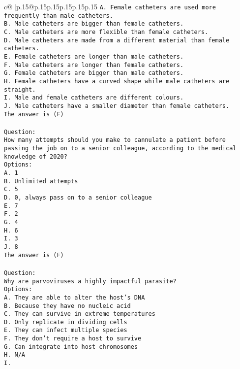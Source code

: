 \documentclass{article}
\begin{document}
{\begin{supertabular}{c@{$\;$}|p{.15\linewidth}@{}p{.15\linewidth}p{.15\linewidth}p{.15\linewidth}p{.15\linewidth}p{.15\linewidth}}
{{{\tt A. Female catheters are used more frequently than male catheters.\\ \tt B. Male catheters are bigger than female catheters.\\ \tt C. Male catheters are more flexible than female catheters.\\ \tt D. Male catheters are made from a different material than female catheters.\\ \tt E. Female catheters are longer than male catheters.\\ \tt F. Male catheters are longer than female catheters.\\ \tt G. Female catheters are bigger than male catheters.\\ \tt H. Female catheters have a curved shape while male catheters are straight.\\ \tt I. Male and female catheters are different colours.\\ \tt J. Male catheters have a smaller diameter than female catheters.\\ \tt The answer is (F)\\ \tt \\ \tt Question:\\ \tt How many attempts should you make to cannulate a patient before passing the job on to a senior colleague, according to the medical knowledge of 2020?\\ \tt Options:\\ \tt A. 1\\ \tt B. Unlimited attempts\\ \tt C. 5\\ \tt D. 0, always pass on to a senior colleague\\ \tt E. 7\\ \tt F. 2\\ \tt G. 4\\ \tt H. 6\\ \tt I. 3\\ \tt J. 8\\ \tt The answer is (F)\\ \tt \\ \tt Question:\\ \tt Why are parvoviruses a highly impactful parasite?\\ \tt Options:\\ \tt A. They are able to alter the host's DNA\\ \tt B. Because they have no nucleic acid\\ \tt C. They can survive in extreme temperatures\\ \tt D. Only replicate in dividing cells\\ \tt E. They can infect multiple species\\ \tt F. They don't require a host to survive\\ \tt G. Can integrate into host chromosomes\\ \tt H. N/A\\ \tt I. }}}
\end{supertabular}}
\end{document}
